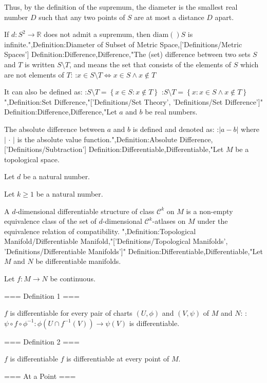 Thus, by the definition of the supremum, the diameter is the smallest real number $D$ such that any two points of $S$ are at most a distance $D$ apart.

If $d: S^2 \to \mathbb R$ does not admit a supremum, then $\mathrm {diam} \left(   \right)S$ is infinite.",Definition:Diameter of Subset of Metric Space,['Definitions/Metric Spaces']
Definition:Difference,Difference,"The (set) difference between two sets $S$ and $T$ is written $S \setminus T$, and means the set that consists of the elements of $S$ which are not elements of $T$:
:$x \in S \setminus T \iff x \in S \land x \notin T$


It can also be defined as:
:$S \setminus T = \left\lbrace x \in S: x \notin T \right\rbrace$
:$S \setminus T = \left\lbrace x: x \in S \land x \notin T \right\rbrace$",Definition:Set Difference,"['Definitions/Set Theory', 'Definitions/Set Difference']"
Definition:Difference,Difference,"Let $a$ and $b$ be real numbers.

The absolute difference between $a$ and $b$ is defined and denoted as:
:$\left\lvert a - b \right\rvert$
where $\left\lvert \, \cdot \, \right\rvert$ is the absolute value function.",Definition:Absolute Difference,['Definitions/Subtraction']
Definition:Differentiable,Differentiable,"Let $M$ be a topological space.

Let $d$ be a natural number.

Let $k \ge 1$ be a natural number.



A $d$-dimensional differentiable structure of class $\mathcal C^k$ on $M$ is a non-empty equivalence class of the set of $d$-dimensional $\mathcal C^k$-atlases on $M$ under the equivalence relation of compatibility.
",Definition:Topological Manifold/Differentiable Manifold,"['Definitions/Topological Manifolds', 'Definitions/Differentiable Manifolds']"
Definition:Differentiable,Differentiable,"Let $M$ and $N$ be differentiable manifolds.

Let $f : M \to N$ be continuous.

=== Definition 1 ===

$f$  is differentiable  for every pair of charts $(U, \phi)$ and $(V,\psi)$ of $M$ and $N$:
:$\psi\circ f\circ \phi^{-1} : \phi ( U \cap f^{-1}(V)) \to \psi(V)$
is differentiable.


=== Definition 2 ===


$f$  is differentiable  $f$ is  differentiable at every point of $M$.


=== At a Point ===

